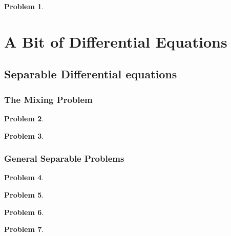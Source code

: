 \documentclass{article}
\newtheorem{problem}{Problem}
\begin{document}
\begin{problem}

\end{problem}
\section{A Bit of Differential Equations}
\subsection{Separable Differential equations}
\subsubsection{The Mixing Problem}
\begin{problem}

\end{problem}


\begin{problem}

\end{problem}

\subsubsection{General Separable Problems}
\begin{problem}

\end{problem}


\begin{problem}

\end{problem}
\begin{problem}

\end{problem}


\begin{problem}

\end{problem}

\end{document}

